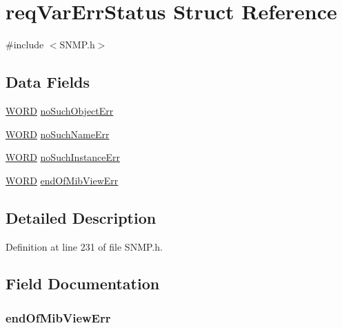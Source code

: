 \hypertarget{structreq_var_err_status}{}\section{req\+Var\+Err\+Status Struct Reference}
\label{structreq_var_err_status}


{\ttfamily \#include $<$S\+N\+M\+P.\+h$>$}

\subsection*{Data Fields}
\begin{DoxyCompactItemize}
\item 
\hyperlink{_generic_type_defs_8h_a2b0e863dadf920709ec53d9088ee7c91}{W\+O\+R\+D} \hyperlink{structreq_var_err_status_a8af3c43b120d41b0db5837435ed5ee3a}{no\+Such\+Object\+Err}
\item 
\hyperlink{_generic_type_defs_8h_a2b0e863dadf920709ec53d9088ee7c91}{W\+O\+R\+D} \hyperlink{structreq_var_err_status_ab5e88e239aa10955b4f56116228f9244}{no\+Such\+Name\+Err}
\item 
\hyperlink{_generic_type_defs_8h_a2b0e863dadf920709ec53d9088ee7c91}{W\+O\+R\+D} \hyperlink{structreq_var_err_status_a135fb82dfca01ff2b1ae21568a9df23a}{no\+Such\+Instance\+Err}
\item 
\hyperlink{_generic_type_defs_8h_a2b0e863dadf920709ec53d9088ee7c91}{W\+O\+R\+D} \hyperlink{structreq_var_err_status_a96ba59a837efde8cf2aea168298e9c2d}{end\+Of\+Mib\+View\+Err}
\end{DoxyCompactItemize}


\subsection{Detailed Description}


Definition at line 231 of file S\+N\+M\+P.\+h.



\subsection{Field Documentation}
\hypertarget{structreq_var_err_status_a96ba59a837efde8cf2aea168298e9c2d}{}
\subsubsection[{end\+Of\+Mib\+View\+Err}]{ end\+Of\+Mib\+View\+Err}\label{structreq_var_err_status_a96ba59a837efde8cf2aea168298e9c2d}


